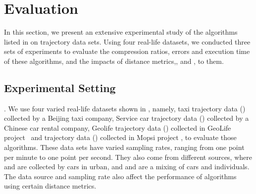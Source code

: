 \section{Evaluation} %
\label{sec-exp}
In this section, we present an extensive experimental study of the \lsa algorithms listed in  on trajectory data sets.
Using four real-life datasets, we conducted three sets of experiments to evaluate the compression ratios, errors and execution time of these algorithms, and the impacts of distance metrics,\ie \ped, \sed and \dad, to them.


\vspace{-1ex}
\subsection{Experimental Setting}

.
We use four varied real-life datasets shown in , namely, taxi trajectory data (\taxi) collected by a Beijing taxi company, Service car trajectory data (\ucar) collected by a Chinese car rental company, Geolife trajectory data (\geolife) collected in GeoLife project~\cite{Web:Geolife} and \mopsi trajectory data (\mopsi) collected in Mopsi project \cite{Web:Mopsi}, to evaluate those \lsa algorithms. These data sets have varied sampling rates, ranging from one point per minute to one point per second.
They also come from different sources, where \taxi and \ucar are collected by cars in urban, and \geolife and \mopsi are a mixing of cars and individuals. The data source and sampling rate also affect the performance of \lsa algorithms using certain distance metrics.

